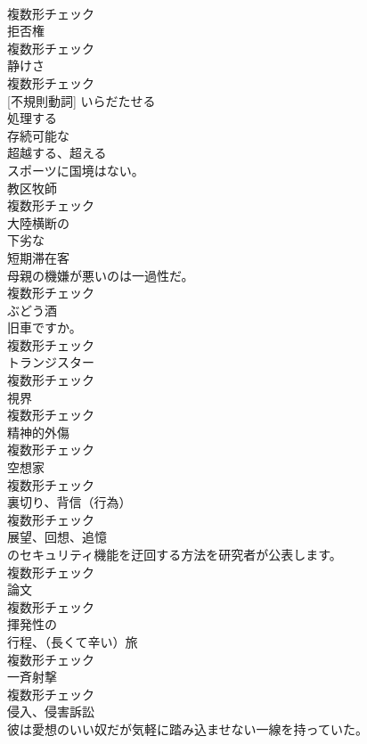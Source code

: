 \documentclass[8pt]{extreport}
\begin{document}
\begin{CJK}{UTF8}{min}
\\	複数形チェック
\\	[名詞]	拒否権	
\\	複数形チェック
\\	[名詞]	静けさ	
\\	複数形チェック
\\	[動詞] [不規則動詞]	いらだたせる	
\\	[動詞]	処理する	
\\	[形容詞]	存続可能な	
\\	[動詞]	超越する、超える	
\\	スポーツに国境はない。	
\\	[名詞]	教区牧師	
\\	複数形チェック
\\	[形容詞]	大陸横断の	
\\	[形容詞]	下劣な	
\\	[名詞]	短期滞在客	
\\	母親の機嫌が悪いのは一過性だ。	
\\	複数形チェック
\\	[名詞]	ぶどう酒	
\\	旧車ですか。	
\\	複数形チェック
\\	[名詞]	トランジスター	
\\	複数形チェック
\\	[名詞]	視界	
\\	複数形チェック
\\	[名詞]	精神的外傷	
\\	複数形チェック
\\	[名詞]	空想家	
\\	複数形チェック
\\	[名詞]	裏切り、背信（行為）	
\\	複数形チェック
\\	[名詞]	展望、回想、追憶	
\\	のセキュリティ機能を迂回する方法を研究者が公表します。	
\\	複数形チェック
\\	[名詞]	論文	
\\	複数形チェック
\\	[形容詞]	揮発性の	
\\	[名詞]	行程、（⻑くて辛い）旅	
\\	複数形チェック
\\	[名詞]	一⻫射撃	
\\	複数形チェック
\\	[名詞]	侵入、侵害訴訟	
\\	彼は愛想のいい奴だが気軽に踏み込ませない一線を持っていた。	

\end{CJK}
\end{document}
